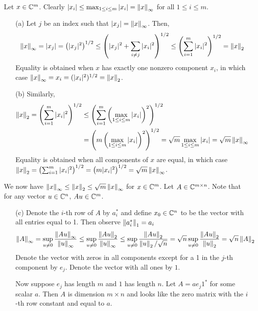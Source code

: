 \documentclass[10pt]{article}
\begin{document}
\begin{solution}[Solution]
Let \( x\in\mathbb{C}^m \). Clearly \( |x_i|\leq \max_{1\leq i\leq m}|x_i|=\left\lVert x\right\rVert_\infty \) for all \( 1\leq i \leq m \).
\begin{enumerate}
	\item[(a)]  Let \( j \) be an index such that \( |x_j|=\left\lVert x\right\rVert_\infty \). Then,
	\[ \left\lVert x\right\rVert_\infty = |x_j| = \left(|x_j|^2\right)^{1/2} \leq \left(|x_j|^2+\sum_{i\neq j}|x_i|^2\right)^{1/2} \leq \left(\sum_{i=1}^{m}|x_i|^2\right)^{1/2} = \left\lVert x\right\rVert_2 \]
	Equality is obtained when \( x \) has exactly one nonzero component \( x_i \), in which case \( \left\lVert x\right\rVert_\infty = x_i = (|x_i|^2)^{1/2} = \left\lVert x\right\rVert_2 \).
	
	\item[(b)] Similarly,
	\begin{align*} \left\lVert x\right\rVert_2 = \left(\sum_{i=1}^{m}|x_i|^2\right)^{1/2}  &\leq \left( \sum_{i=1}^{m} \left(\max_{1\leq i\leq m}|x_i|\right)^2 \right)^{1/2} \\ &= \left( m\left(\max_{1\leq i\leq m}|x_i|\right)^2 \right)^{1/2} = \sqrt{m}\max_{1\leq i\leq m}|x_i| = \sqrt{m}\left\lVert x\right\rVert_\infty \end{align*}
	Equality is obtained when all components of \( x \) are equal, in which case \( \left\lVert x\right\rVert_2 = \left(\sum_{i=1}^{m}|x_i|^2\right)^{1/2} = \left(m|x_i|^2\right)^{1/2} = \sqrt{m}\left\lVert x\right\rVert_\infty \).
\end{enumerate}

We now have \( \left\lVert x\right\rVert_\infty\leq \left\lVert x\right\rVert_2\leq \sqrt{m}\left\lVert x\right\rVert_\infty \) for \( x\in \mathbb{C}^m \). Let \( A\in\mathbb{C}^{m\times n} \). Note that for any vector \( u\in\mathbb{C}^n \), \( Au\in\mathbb{C}^m \).

\begin{enumerate}
	\item[(c)] Denote the \( i \)-th row of \( A \) by \( a_i^* \) and define \( x_0 \in \mathbb{C}^n \) to be the vector with all entries equal to 1. Then observe \( \left\lVert a_i^*\right\rVert_1 = a_i \)
	\[ \left\lVert A\right\rVert_\infty = \sup_{u\neq0}\dfrac{\left\lVert Au\right\rVert_\infty}{\left\lVert u\right\rVert_\infty} \leq \sup_{u\neq0}\dfrac{\left\lVert Au\right\rVert_2}{\left\lVert u\right\rVert_\infty} \leq \sup_{u\neq0}\dfrac{\left\lVert Au\right\rVert_2}{\left\lVert u\right\rVert_2/\sqrt{n}} = \sqrt{n}\sup_{u\neq0}\dfrac{\left\lVert Au\right\rVert_2}{\left\lVert u\right\rVert_2} = \sqrt{n}\left\lVert A\right\rVert_2 \]
	Denote the vector with zeros in all components except for a 1 in the \( j \)-th component by \( e_j \). Denote the vector with all ones by \( 1 \).
	
	Now suppose \( e_j \) has length \( m \) and \( 1 \) has length \( n \). Let \( A=ae_j1^* \) for some scalar \( a \). Then \( A \) is dimension \( m\times n \) and looks like the zero matrix with the \( i \)-th row constant and equal to \( a \).
	

\end{enumerate}
\end{solution}
\end{document}
